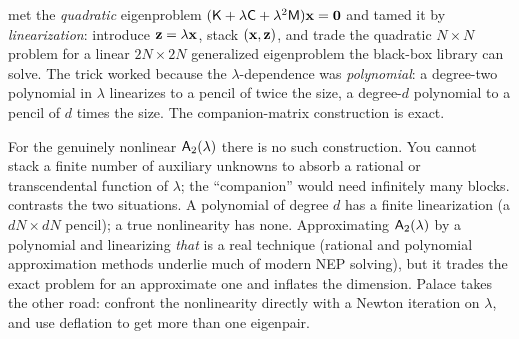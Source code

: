  met the \emph{quadratic} eigenproblem
$(\mathsf{K}+\lambda\mathsf{C}+\lambda^2\mathsf{M})\mathbf{x}=\mathbf 0$ and tamed it by
\emph{linearization}: introduce $\mathbf{z}=\lambda\mathbf{x}$, stack $(\mathbf{x},\mathbf{z})$, and trade the
quadratic $N\times N$ problem for a linear $2N\times 2N$ generalized
eigenproblem the black-box library can solve. The trick worked because the
$\lambda$-dependence was \emph{polynomial}: a degree-two polynomial in $\lambda$
linearizes to a pencil of twice the size, a degree-$d$ polynomial to a pencil of
$d$ times the size. The companion-matrix construction is exact.

For the genuinely nonlinear $\mathsf{A}_2(\lambda)$ there is no such construction.
You cannot stack a finite number of auxiliary unknowns to absorb a rational or
transcendental function of $\lambda$; the ``companion'' would need infinitely many
blocks.  contrasts the two situations. A polynomial of
degree $d$ has a finite linearization (a $dN\times dN$ pencil); a true
nonlinearity has none. Approximating $\mathsf{A}_2(\lambda)$ by a polynomial and
linearizing \emph{that} is a real technique (rational and polynomial
approximation methods underlie much of modern NEP solving), but it trades the
exact problem for an approximate one and inflates the dimension. Palace takes the
other road: confront the nonlinearity directly with a Newton iteration on
$\lambda$, and use deflation to get more than one eigenpair.

